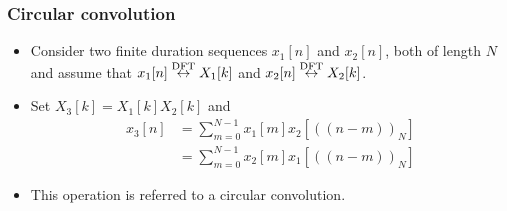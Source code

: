 

\begin{frame}
\frametitle{Circular convolution}
\begin{itemize}
\item Consider two finite duration sequences $x_1[n]$ and $x_2[n]$, both of length $N$ and assume that $x_1[n] \stackrel{\mathrm{DFT}}{\leftrightarrow} X_1[k]$ and $x_2[n] \stackrel{\mathrm{DFT}}{\leftrightarrow} X_2[k]$. 
\item Set $X_3[k]= X_1[k]X_2[k]$ and 
\begin{align*}
x_3[n] 
&= \sum_{m=0}^{N-1} x_1[m] x_2[((n-m))_N] \\
&= \sum_{m=0}^{N-1} x_2[m] x_1[((n-m))_N]
\end{align*}
\item This operation is referred to a \alert{circular convolution}.
\end{itemize}
\end{frame}

